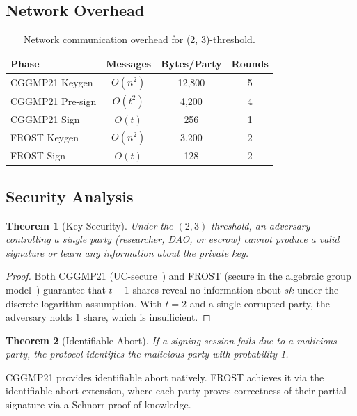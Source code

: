 \documentclass[11pt,letterpaper]{article}
\newtheorem{theorem}{Theorem}[section]
\begin{document}
\subsection{Network Overhead}

\begin{table}[t]
\centering
\begin{tabular}{lccc}
\toprule
\textbf{Phase} & \textbf{Messages} & \textbf{Bytes/Party} & \textbf{Rounds} \\
\midrule
CGGMP21 Keygen & $O(n^2)$ & 12,800 & 5 \\
CGGMP21 Pre-sign & $O(t^2)$ & 4,200 & 4 \\
CGGMP21 Sign & $O(t)$ & 256 & 1 \\
FROST Keygen & $O(n^2)$ & 3,200 & 2 \\
FROST Sign & $O(t)$ & 128 & 2 \\
\bottomrule
\end{tabular}
\caption{Network communication overhead for (2, 3)-threshold.}
\label{tab:network}
\end{table}

\subsection{Security Analysis}

\begin{theorem}[Key Security]
Under the $(2, 3)$-threshold, an adversary controlling a single party (researcher, DAO, or escrow) cannot produce a valid signature or learn any information about the private key.
\end{theorem}

\begin{proof}
Both CGGMP21 (UC-secure~\cite{cggmp2021}) and FROST (secure in the algebraic group model~\cite{komlo2020frost}) guarantee that $t - 1$ shares reveal no information about $sk$ under the discrete logarithm assumption. With $t = 2$ and a single corrupted party, the adversary holds 1 share, which is insufficient.
\end{proof}

\begin{theorem}[Identifiable Abort]
If a signing session fails due to a malicious party, the protocol identifies the malicious party with probability 1.
\end{theorem}

CGGMP21 provides identifiable abort natively. FROST achieves it via the identifiable abort extension, where each party proves correctness of their partial signature via a Schnorr proof of knowledge.
\end{document}
